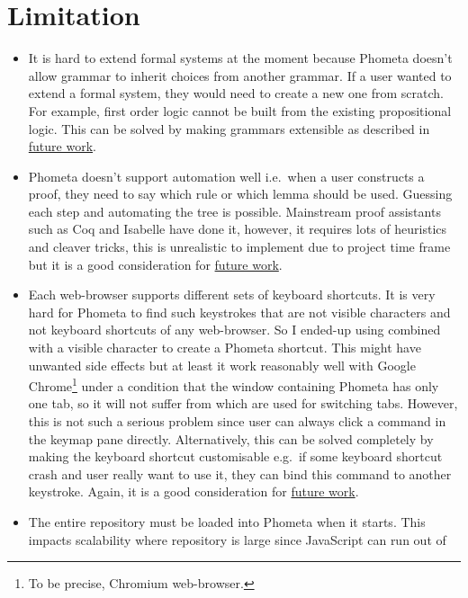 \documentclass[master.tex]{subfiles}
\begin{document}
\vspace{1em}

\section{Limitation}

\newcommand{\hrefFutureWork}{\hyperref[sec:future_work]{future work}}

\begin{itemize}
\item It is hard to extend formal systems at the moment because Phometa doesn't
  allow grammar to inherit choices from another grammar. If a user wanted to
  extend a formal system, they would need to create a new one from scratch. For
  example, first order logic cannot be built from the existing propositional
  logic. This can be solved by making grammars extensible as described in
  \hrefFutureWork.
\item Phometa doesn't support automation well i.e.\ when a user constructs a
  proof, they need to say which rule or which lemma should be used. Guessing
  each step and automating the tree is possible. Mainstream proof assistants
  such as Coq and Isabelle have done it, however, it requires lots of heuristics
  and cleaver tricks, this is unrealistic to implement due to project time frame
  but it is a good consideration for \hrefFutureWork.
\item Each web-browser supports different sets of keyboard shortcuts. It is very
  hard for Phometa to find such keystrokes that are not visible characters and
  not keyboard shortcuts of any web-browser. So I ended-up using 
  combined with a visible character to create a Phometa shortcut. This might
  have unwanted side effects but at least it work reasonably well with Google
  Chrome\footnote{To be precise, Chromium web-browser.} under a condition that
  the window containing Phometa has only one tab, so it will not suffer from
   which are used for switching tabs. However, this is not
  such a serious problem since user can always click a command in the keymap
  pane directly. Alternatively, this can be solved completely by making the
  keyboard shortcut customisable e.g.\ if some keyboard shortcut crash and user
  really want to use it, they can bind this command to another keystroke. Again,
  it is a good consideration for \hrefFutureWork.
\item The entire repository must be loaded into Phometa when it starts. This
  impacts scalability where repository is large since JavaScript can run out of

\end{itemize}
\end{document}
